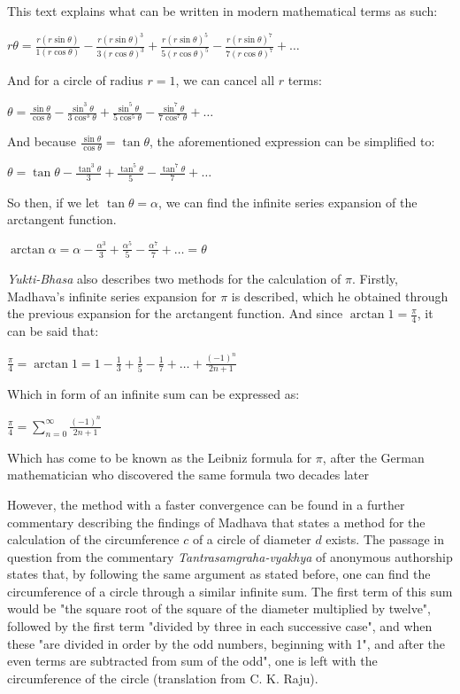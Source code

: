 This text explains what can be written in modern mathematical terms as such:

$r \theta = \frac{r (r \sin{\theta})}{1 (r \cos{\theta})} - \frac{r (r \sin{\theta})^3}{3 (r \cos{\theta})^3} + \frac{r (r \sin{\theta})^5}{5 (r \cos{\theta})^5} - \frac{r (r \sin{\theta})^7}{7 (r \cos{\theta})^7} + \dots$

And for a circle of radius $r = 1$, we can cancel all $r$ terms:

$\theta = \frac{\sin{\theta}}{\cos{\theta}} - \frac{\sin^3{\theta}}{3 \cos^3{\theta}} + \frac{\sin^5{\theta}}{5 \cos^5{\theta}} - \frac{\sin^7{\theta}}{7 \cos^7{\theta}} + \dots$

And because $\frac{\sin{\theta}}{\cos{\theta}} = \tan{\theta}$, the aforementioned expression 
can be simplified to: 

$\theta = \tan{\theta} - \frac{\tan^3{\theta}}{3} + \frac{\tan^5{\theta}}{5} - \frac{\tan^7{\theta}}{7} + \dots$

So then, if we let $\tan{\theta} = \alpha$, we can find the infinite series expansion 
of the arctangent function. 

$\arctan{\alpha} = \alpha - \frac{\alpha^3}{3} + \frac{\alpha^5}{5} - \frac{\alpha^7}{7} + \dots = \theta$

\textit{Yukti-Bhasa} also describes two methods for the calculation of $\pi$. Firstly, 
Madhava's infinite series expansion for $\pi$ is described, which he obtained through 
the previous expansion for the arctangent function. And since $\arctan{1} = \frac{\pi}{4}$,
it can be said that: 

$\frac{\pi}{4} = \arctan{1} = 1 - \frac{1}{3} + \frac{1}{5} - \frac{1}{7} + \dots + \frac{(-1)^n}{2n +1}$

Which in form of an infinite sum can be expressed as: 

$\frac{\pi}{4} = \sum\limits_{n=0}^\infty \frac{(-1)^n}{2n +1}$

Which has come to be known as the Leibniz formula for $\pi$, after the German mathematician 
who discovered the same formula two decades later \cite{edwards_1994}

However, the method with a faster convergence can be found in a further commentary describing the findings of Madhava that states  
a method for the calculation of the circumference $c$ of a circle of diameter $d$ exists. 
The passage in question from the commentary \textit{Tantrasamgraha-vyakhya} of 
anonymous authorship states that, by following the same argument as stated before, one 
can find the circumference of a circle through a similar infinite sum. The first 
term of this sum would be "the square root of the square of the diameter multiplied by 
twelve", followed by the first term "divided by three in each successive case", and 
when these "are divided in order by the odd numbers, beginning with 1", and after the 
even terms are subtracted from sum of the odd", one is left with the circumference of the 
circle (translation from C. K. Raju). \cite{raju_2007} 

